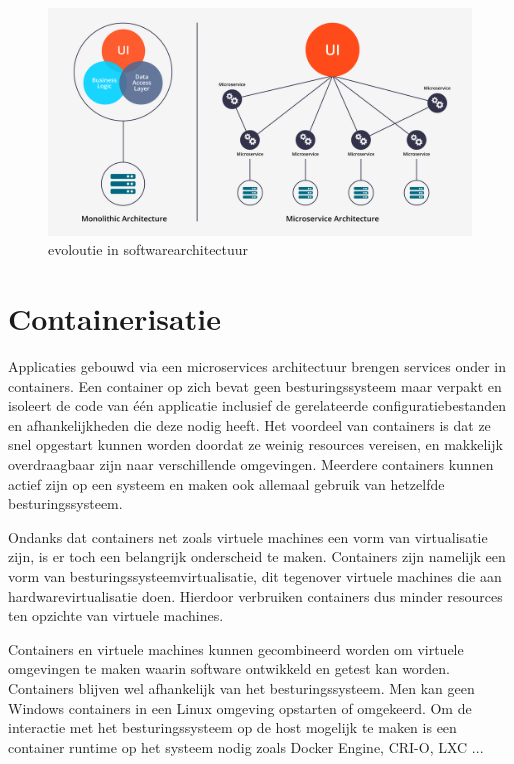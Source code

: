 \begin{figure}[h]
    \centering
    \includegraphics[scale=.1]{img/monolithic_vs_microservices.png}
    \caption{evoloutie in softwarearchitectuur \autocite{Sanjaya2020}}
    \label{softwarearchitectuur}
\end{figure}

\section{Containerisatie}

Applicaties gebouwd via een microservices architectuur brengen services onder in containers. Een container op zich bevat geen besturingssysteem maar verpakt en isoleert de code van één applicatie inclusief de gerelateerde configuratiebestanden en afhankelijkheden die deze nodig heeft. Het voordeel van containers is dat ze snel opgestart kunnen worden doordat ze weinig resources vereisen, en makkelijk overdraagbaar zijn naar verschillende omgevingen. Meerdere containers kunnen actief zijn op een systeem en maken ook allemaal gebruik van hetzelfde besturingssysteem. \autocite{Singh2020}

Ondanks dat containers net zoals virtuele machines een vorm van virtualisatie zijn, is er toch een belangrijk onderscheid te maken. Containers zijn namelijk een vorm van besturingssysteemvirtualisatie, dit tegenover virtuele machines die aan hardwarevirtualisatie doen.
Hierdoor verbruiken containers dus minder resources ten opzichte van virtuele machines. \autocite{Holt2018}

Containers en virtuele machines kunnen gecombineerd worden om virtuele omgevingen te maken waarin software ontwikkeld en getest kan worden. Containers blijven wel afhankelijk van het besturingssysteem. Men kan geen Windows containers in een Linux omgeving opstarten of omgekeerd. Om de interactie met het besturingssysteem op de host mogelijk te maken is een container runtime op het systeem nodig zoals Docker Engine, CRI-O, LXC ...

